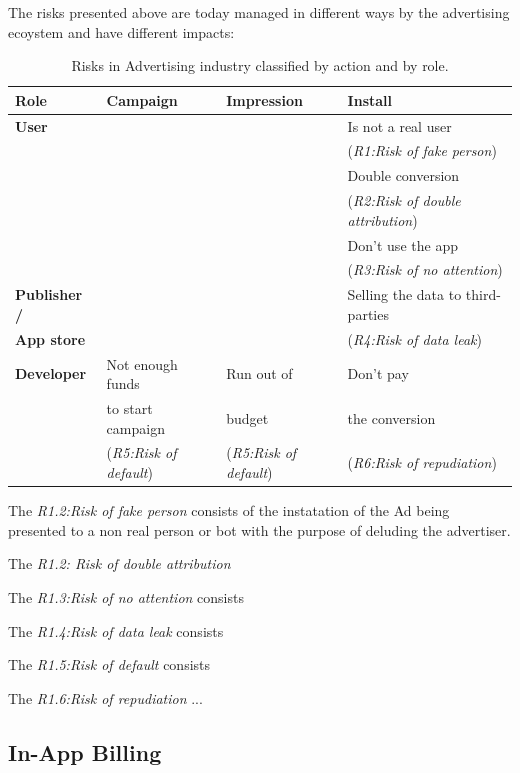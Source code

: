 
The risks presented above are today managed in different ways by the advertising ecoystem and have different impacts:

\begin{table}[h]
\centering
\begin{tabular}{|l||l|l|l|} \hline
{\bf Role} & {\bf Campaign} & {\bf Impression}  & {\bf Install} \\ \hline
{\bf User} & & & Is not a real user \\ 
 & & & ({\em R1:Risk of fake person}) \\ 
 & & & Double conversion  \\
 & & & ({\em R2:Risk of double attribution}) \\
 & & & Don't use the app  \\
 & & & ({\em R3:Risk of no attention}) \\  \hline
{\bf Publisher  /}  & & & Selling the data to third-parties \\ 
{\bf App store} & & & ({\em R4:Risk of data leak})\\ \hline
{\bf Developer} & Not enough funds & Run out of & Don't pay \\  
 & to start campaign & budget & the conversion \\  
  & ({\em R5:Risk of default}) & ({\em R5:Risk of default}) & ({\em R6:Risk of repudiation}) \\  
\hline\end{tabular}
\caption{Risks in Advertising industry classified by action and by role.}
\label{tab:risks}
\end{table}


The {\em R1.2:Risk of fake person} consists of the instatation of the Ad being presented to a non real person or bot with the purpose of deluding the advertiser.

\medskip

The {\em R1.2: Risk of double attribution} 

\medskip

The {\em R1.3:Risk of no attention}  consists

\medskip

The {\em R1.4:Risk of data leak} consists

\medskip

The {\em R1.5:Risk of default} consists

\medskip

The {\em R1.6:Risk of repudiation} ...


\subsection{In-App Billing}

